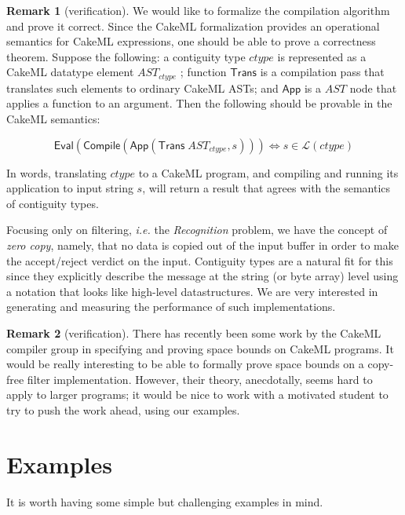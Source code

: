 \documentclass{article}
\newcommand{\ie}{\textit{i.e.}}
\newcommand{\konst}[1]{\ensuremath{\mathsf{#1}}}
\newcommand{\Lang}[1]{\ensuremath{{\mathcal L}({#1})}}
\theoremstyle{definition}
\newtheorem{remark}{Remark}
\begin{document}
\begin{remark} [verification] We would like to formalize the compilation
algorithm and prove it correct. Since the CakeML formalization
provides an operational semantics for CakeML expressions, one should
be able to prove a correctness theorem. Suppose the following: a
contiguity type $\mathit{ctype}$ is represented as a CakeML datatype
element $\mathit{AST}_{\mathit{ctype}}$ ; function $\konst{Trans}$ is
a compilation pass that translates such elements to ordinary CakeML
ASTs; and \konst{App} is a $\mathit{AST}$ node that applies a function
to an argument. Then the following should be provable in the CakeML
semantics:

\[
 \konst{Eval}(\konst{Compile} (\konst{App}(\konst{Trans}\; \mathit{AST}_\mathit{ctype},s))) \iff s \in \Lang{\mathit{ctype}}
\]

In words, translating $\mathit{ctype}$ to a CakeML program, and
compiling and running its application to input string $s$, will
return a result that agrees with the semantics of contiguity types.

\end{remark}

Focusing only on filtering, \ie{} the \emph{Recognition} problem, we
have the concept of \emph{zero copy}, namely, that no data is copied
out of the input buffer in order to make the accept/reject verdict on
the input. Contiguity types are a natural fit for this since they
explicitly describe the message at the string (or byte array) level
using a notation that looks like high-level datastructures. We are
very interested in generating and measuring the performance of such
implementations.

\begin{remark} [verification]
There has recently been some work by the CakeML compiler group in
specifying and proving space bounds on CakeML programs. It would be
really interesting to be able to formally prove space bounds on a
copy-free filter implementation. However, their theory, anecdotally,
seems hard to apply to larger programs; it would be nice to work with
a motivated student to try to push the work ahead, using our examples.
\end{remark}


\section{Examples}

It is worth having some simple but challenging examples in mind.
\end{document}
